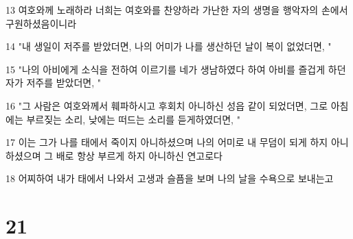 \par 13 여호와께 노래하라 너희는 여호와를 찬양하라 가난한 자의 생명을 행악자의 손에서 구원하셨음이니라
\par 14 "내 생일이 저주를 받았더면, 나의 어미가 나를 생산하던 날이 복이 없었더면, "
\par 15 "나의 아비에게 소식을 전하여 이르기를 네가 생남하였다 하여 아비를 즐겁게 하던 자가 저주를 받았더면, "
\par 16 "그 사람은 여호와께서 훼파하시고 후회치 아니하신 성읍 같이 되었더면, 그로 아침에는 부르짖는 소리, 낮에는 떠드는 소리를 듣게하였더면, "
\par 17 이는 그가 나를 태에서 죽이지 아니하셨으며 나의 어미로 내 무덤이 되게 하지 아니하셨으며 그 배로 항상 부르게 하지 아니하신 연고로다
\par 18 어찌하여 내가 태에서 나와서 고생과 슬픔을 보며 나의 날을 수욕으로 보내는고

\chapter{21}


